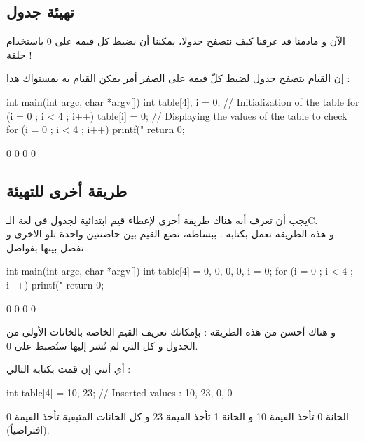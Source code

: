 \subsection{تهيئة جدول}

الآن و مادمنا قد عرفنا كيف نتصفح جدولا، يمكننا أن نضبط كل قيمه على 0 باستخدام حلقة !

إن القيام بتصفح جدول لضبط كلّ قيمه على الصفر أمر يمكن القيام به بمستواك هذا :

\begin{Csource}
int main(int argc, char *argv[])
{
	int table[4], i = 0;
	// Initialization of the table
	for (i = 0 ; i < 4 ; i++)
	{
    		table[i] = 0;
	}
	// Displaying the values of the table to check
	for (i = 0 ; i < 4 ; i++)
	{
    		printf("%
	}
	return 0;
}
\end{Csource}

\begin{Console}
0
0
0
0
\end{Console}

\subsection{طريقة أخرى للتهيئة}

يجب أن تعرف أنه هناك طريقة أخرى لإعطاء قيم ابتدائية لجدول في لغة الـ\textenglish{C}.\\
و هذه الطريقة تعمل بكتابة
.
ببساطة، تضع القيم بين حاضنتين واحدة تلو الاخرى و تفصل بينها بفواصل.

\begin{Csource}
int main(int argc, char *argv[])
{
	int table[4] = {0, 0, 0, 0}, i = 0;
	for (i = 0 ; i < 4 ; i++)
	{
    	printf("%
	}
	return 0;
}
\end{Csource}

\begin{Console}
0
0
0
0
\end{Console}

و هناك أحسن من هذه الطريقة : بإمكانك تعريف القيم الخاصة بالخانات الأولى من الجدول و كل التي لم تُشر إليها ستُضبط على 0.

أي أنني إن قمت بكتابة التالي :

\begin{Csource}
int table[4] = {10, 23}; // Inserted values : 10, 23, 0, 0
\end{Csource}

الخانة 0 تأخذ القيمة 10 و الخانة 1 تأخذ القيمة 23 و كل الخانات المتبقية تأخذ القيمة 0 (افتراضياً).

